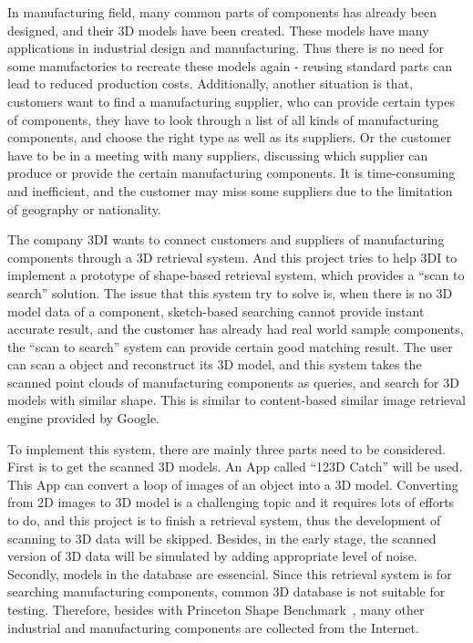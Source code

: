 In manufacturing field, many common parts of components has already been designed, and their 3D models have been created. These models have many applications in industrial design and manufacturing. Thus there is no need for some manufactories to recreate these models again - reusing standard parts can lead to reduced production costs. Additionally, another situation is that, customers want to find a manufacturing supplier, who can provide certain types of components, they have to look through a list of all kinds of manufacturing components, and choose the right type as well as its suppliers. Or the customer have to be in a meeting with many suppliers, discussing which supplier can produce or provide the certain manufacturing components. It is time-consuming and inefficient, and the customer may miss some suppliers due to the limitation of geography or nationality. 

The company 3DI wants to connect customers and suppliers of manufacturing components through a 3D retrieval system. And this project tries to help 3DI to implement a prototype of shape-based retrieval system, which provides a ``scan to search'' solution. The issue that this system try to solve is, when there is no 3D model data of a component, sketch-based searching cannot provide instant accurate result, and the customer has already had real world sample components, the ``scan to search'' system can provide certain good matching result. The user can scan a object and reconstruct its 3D model, and this system takes the scanned point clouds of manufacturing components as queries, and search for 3D models with similar shape. This is similar to content-based similar image retrieval engine provided by Google. 

To implement this system, there are mainly three parts need to be considered. First is to get the scanned 3D models. An App called ``123D Catch'' will be used. This App can convert a loop of images of an object into a 3D model. Converting from 2D images to 3D model is a challenging topic and it requires lots of efforts to do, and this project is to finish a retrieval system, thus the development of scanning to 3D data will be skipped. Besides, in the early stage, the scanned version of 3D data will be simulated by adding appropriate level of noise. Secondly, models in the database are essencial. Since this retrieval system is for searching  manufacturing components, common 3D database is not suitable for testing. Therefore, besides with  Princeton Shape Benchmark~\cite{shilane2004princeton}, many other industrial and manufacturing components are collected from the Internet.

